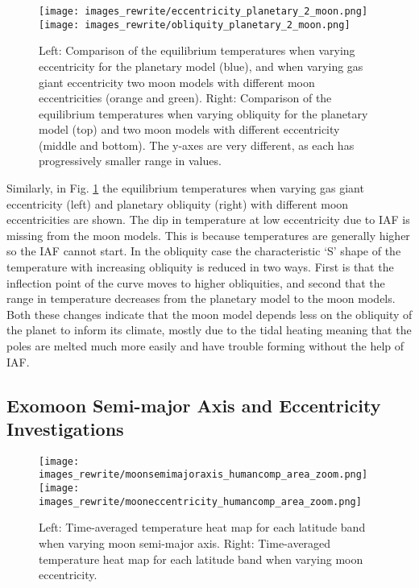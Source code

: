 \documentclass[12pt, onecolumn]{revtex4-2}    %
\begin{document}
\begin{figure}[t]
  \texttt{[image: images\_rewrite/eccentricity\_planetary\_2\_moon.png]}
  \texttt{[image: images\_rewrite/obliquity\_planetary\_2\_moon.png]}
  \caption{
    Left: Comparison of the equilibrium temperatures when varying eccentricity for the planetary model (blue), and when varying gas giant eccentricity two moon models with different moon eccentricities (orange and green).
    Right: Comparison of the equilibrium temperatures when varying obliquity for the planetary model (top) and two moon models with different eccentricity (middle and bottom).
    The y-axes are very different, as each has progressively smaller range in values.
  }
  \label{fig:eccentricity_obliquity_comparisions}
\end{figure}

Similarly, in Fig. \ref{fig:eccentricity_obliquity_comparisions} the equilibrium temperatures when varying gas giant eccentricity (left) and planetary obliquity (right) with different moon eccentricities are shown.
The dip in temperature at low eccentricity due to IAF is missing from the moon models.
This is because temperatures are generally higher so the IAF cannot start.
In the obliquity case the characteristic `S' shape of the temperature with increasing obliquity is reduced in two ways.
First is that the inflection point of the curve moves to higher obliquities, and second that the range in temperature decreases from the planetary model to the moon models.
Both these changes indicate that the moon model depends less on the obliquity of the planet to inform its climate, mostly due to the tidal heating meaning that the poles are melted much more easily and have trouble forming without the help of IAF.

\subsection{Exomoon Semi-major Axis and Eccentricity Investigations} \label{ssec:Exomoon_specific_results}
%
\begin{figure}[t]
  \texttt{[image: images\_rewrite/moonsemimajoraxis\_humancomp\_area\_zoom.png]}
  \texttt{[image: images\_rewrite/mooneccentricity\_humancomp\_area\_zoom.png]}
  \caption{
    Left:  Time-averaged temperature heat map for each latitude band when varying moon semi-major axis.
    Right: Time-averaged temperature heat map for each latitude band when varying moon eccentricity.
  }
  \label{fig:moon_semimajoraxis_eccentricity}
\end{figure}
\end{document}
